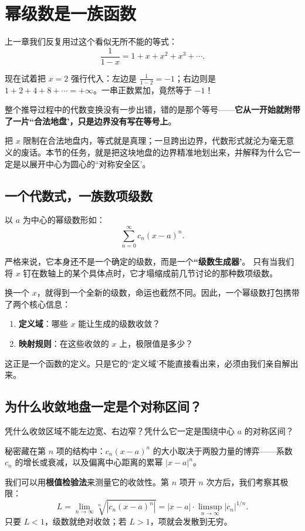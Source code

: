 \section{幂级数是一族函数}
\label{sec:02-Calculus/05-Sequences-and-Series/05}

上一章我们反复用过这个看似无所不能的等式：
\[
\frac1{1-x}=1+x+x^2+x^3+\cdots.
\]

现在试着把 \(x=2\) 强行代入：左边是 \(\frac{1}{1-2}=-1\)；右边则是 \(1+2+4+8+\cdots = +\infty\)。一串正数累加，竟然等于 \(-1\)！

整个推导过程中的代数变换没有一步出错，错的是那个等号——\textbf{它从一开始就附带了一片``合法地盘'，只是边界没有写在等号上}。

把 \(x\) 限制在合法地盘内，等式就是真理；一旦跨出边界，代数形式就沦为毫无意义的废话。本节的任务，就是把这块地盘的边界精准地划出来，并解释为什么它一定是以展开中心为圆心的``对称安全区'。

\subsection{一个代数式，一族数项级数}

以 \(a\) 为中心的幂级数形如：
\[
\sum_{n=0}^{\infty}c_n(x-a)^n.
\]

严格来说，它本身还不是一个确定的级数，而是一个\textbf{``级数生成器'}。
只有当我们将 \(x\) 钉在数轴上的某个具体点时，它才塌缩成前几节讨论的那种数项级数。

换一个 \(x\)，就得到一个全新的级数，命运也截然不同。因此，一个幂级数打包携带了两个核心信息：
\begin{enumerate}
    \item \textbf{定义域}：哪些 \(x\) 能让生成的级数收敛？
    \item \textbf{映射规则}：在这些收敛的 \(x\) 上，极限值是多少？
\end{enumerate}
这正是一个函数的定义。只是它的``定义域'不能直接看出来，必须由我们亲自解出来。

\subsection{为什么收敛地盘一定是个对称区间？}

凭什么收敛区域不能左边宽、右边窄？凭什么它一定是围绕中心 \(a\) 的对称区间？

秘密藏在第 \(n\) 项的结构中：\(c_n(x-a)^n\) 的大小取决于两股力量的博弈——系数 \(c_n\) 的增长或衰减，以及偏离中心距离的累幂 \(|x-a|^n\)。

我们可以用\textbf{根值检验法}来测量它的收敛性。第 \(n\) 项开 \(n\) 次方后，我们考察其极限：
\[
L = \lim_{n\to\infty} \sqrt[n]{|c_n(x-a)^n|} = |x-a| \cdot \limsup_{n\to\infty}|c_n|^{1/n}.
\]
只要 \(L < 1\)，级数就绝对收敛；若 \(L > 1\)，项就会发散到无穷。

